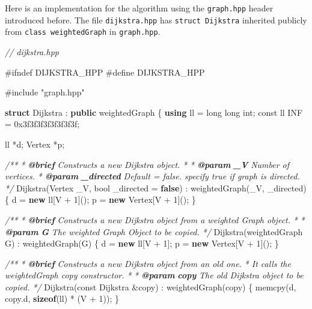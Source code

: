 \documentclass[
]{article}
\newenvironment{Shaded}{}{}
\newcommand{\AnnotationTok}[1]{\textcolor[rgb]{0.38,0.63,0.69}{\textbf{\textit{#1}}}}
\newcommand{\AttributeTok}[1]{\textcolor[rgb]{0.49,0.56,0.16}{#1}}
\newcommand{\BaseNTok}[1]{\textcolor[rgb]{0.25,0.63,0.44}{#1}}
\newcommand{\CommentTok}[1]{\textcolor[rgb]{0.38,0.63,0.69}{\textit{#1}}}
\newcommand{\CommentVarTok}[1]{\textcolor[rgb]{0.38,0.63,0.69}{\textbf{\textit{#1}}}}
\newcommand{\DataTypeTok}[1]{\textcolor[rgb]{0.56,0.13,0.00}{#1}}
\newcommand{\DecValTok}[1]{\textcolor[rgb]{0.25,0.63,0.44}{#1}}
\newcommand{\ImportTok}[1]{#1}
\newcommand{\KeywordTok}[1]{\textcolor[rgb]{0.00,0.44,0.13}{\textbf{#1}}}
\newcommand{\NormalTok}[1]{#1}
\newcommand{\PreprocessorTok}[1]{\textcolor[rgb]{0.74,0.48,0.00}{#1}}
\begin{document}
Here is an implementation for the algorithm using the \texttt{graph.hpp}
header introduced before. The file \texttt{dijkstra.hpp} has
\texttt{struct\ Dijkstra} inherited publicly from
\texttt{class\ weightedGraph} in \texttt{graph.hpp}.

\begin{Shaded}
\begin{Highlighting}[]
\CommentTok{// dijkstra.hpp}

\PreprocessorTok{\#ifndef DIJKSTRA\_HPP}
\PreprocessorTok{\#define DIJKSTRA\_HPP}

\PreprocessorTok{\#include }\ImportTok{"graph.hpp"}

\KeywordTok{struct}\NormalTok{ Dijkstra : }\KeywordTok{public}\NormalTok{ weightedGraph \{}
    \KeywordTok{using}\NormalTok{ ll = }\DataTypeTok{long} \DataTypeTok{long} \DataTypeTok{int}\NormalTok{;}
    \AttributeTok{const}\NormalTok{ ll INF = }\BaseNTok{0x3f3f3f3f3f3f3f3f}\NormalTok{;}

\NormalTok{    ll *d;}
\NormalTok{    Vertex *p;}

    \CommentTok{/**}
\CommentTok{     * }\AnnotationTok{@brief}\CommentTok{ Constructs a new Dijkstra object.}
\CommentTok{     * }
\CommentTok{     * }\AnnotationTok{@param}\CommentTok{ }\CommentVarTok{\_V}\CommentTok{ Number of vertices.}
\CommentTok{     * }\AnnotationTok{@param}\CommentTok{ }\CommentVarTok{\_directed}\CommentTok{ Default = false. specify true if graph is directed.}
\CommentTok{     */}
\NormalTok{    Dijkstra(Vertex \_V, }\DataTypeTok{bool}\NormalTok{ \_directed = }\KeywordTok{false}\NormalTok{) : weightedGraph(\_V, \_directed) \{}
\NormalTok{        d = }\KeywordTok{new}\NormalTok{ ll[V + }\DecValTok{1}\NormalTok{]();}
\NormalTok{        p = }\KeywordTok{new}\NormalTok{ Vertex[V + }\DecValTok{1}\NormalTok{]();}
\NormalTok{    \}}

    \CommentTok{/**}
\CommentTok{     * }\AnnotationTok{@brief}\CommentTok{ Constructs a new Dijkstra object from a weighted Graph object.}
\CommentTok{     * }
\CommentTok{     * }\AnnotationTok{@param}\CommentTok{ }\CommentVarTok{G}\CommentTok{ The weighted Graph Object to be copied.}
\CommentTok{     */}
\NormalTok{    Dijkstra(weightedGraph G) : weightedGraph(G) \{}
\NormalTok{        d = }\KeywordTok{new}\NormalTok{ ll[V + }\DecValTok{1}\NormalTok{];}
\NormalTok{        p = }\KeywordTok{new}\NormalTok{ Vertex[V + }\DecValTok{1}\NormalTok{]();}
\NormalTok{    \}}

    \CommentTok{/**}
\CommentTok{     * }\AnnotationTok{@brief}\CommentTok{ Constructs a new Dijkstra object from an old one. }
\CommentTok{     * It calls the weightedGraph copy constructor.}
\CommentTok{     * }
\CommentTok{     * }\AnnotationTok{@param}\CommentTok{ }\CommentVarTok{copy}\CommentTok{ The old Dijkstra object to be copied.}
\CommentTok{     */}
\NormalTok{    Dijkstra(}\AttributeTok{const}\NormalTok{ Dijkstra \&copy) : weightedGraph(copy) \{}
\NormalTok{        memcpy(d, copy.d, }\KeywordTok{sizeof}\NormalTok{(ll) * (V + }\DecValTok{1}\NormalTok{));}
\NormalTok{    \}}
    


\end{Highlighting}
\end{Shaded}
\end{document}
